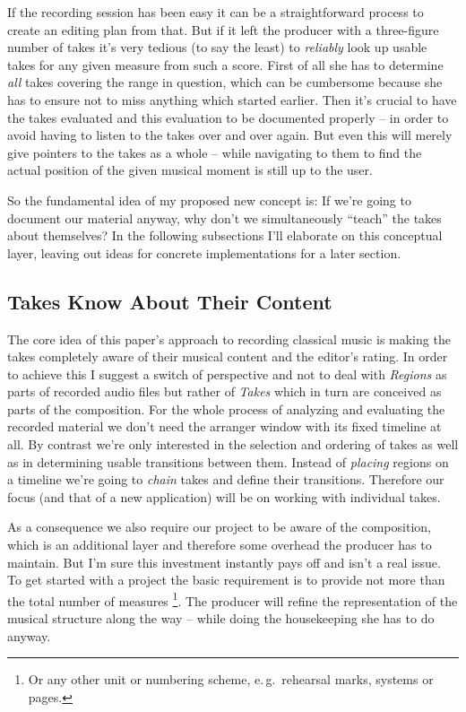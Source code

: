 \documentclass[11pt,a4paper]{article}
\begin{document}
If the recording session has been easy it can be a straightforward process to
create an editing plan from that.
But if it left the producer with a three-figure number of takes it's very
tedious (to say the least) to \emph{reliably} look up usable takes for any given
measure from such a score.
First of all she has to determine \emph{all} takes covering the range in
question, which can be cumbersome because she has to ensure not to miss anything
which started earlier.
Then it's crucial to have the takes evaluated and this evaluation to be
documented properly -- in order to avoid having to listen to the takes over and
over again.
But even this will merely give pointers to the takes as a whole -- while
navigating to them to find the actual position of the given musical moment is
still up to the user.

So the fundamental idea of my proposed new concept is:
If we're going to document our material anyway, why don't we simultaneously
“teach” the takes about themselves?
In the following subsections I'll elaborate on this conceptual layer, leaving out
ideas for concrete implementations for a later section.

\subsection{Takes Know About Their Content}

The core idea of this paper's approach to recording classical music is making
the takes completely aware of their musical content and the editor's rating.
In order to achieve this I suggest a switch of perspective and not to deal with
\emph{Regions} as parts of recorded audio files but rather of \emph{Takes} which
in turn are conceived as parts of the composition.
For the whole process of analyzing and evaluating the recorded material we don't
need the arranger window with its fixed timeline at all.
By contrast we're only interested in the selection and ordering of takes as well
as in determining usable transitions between them.
Instead of \emph{placing} regions on a timeline we're going to \emph{chain}
takes and define their transitions.
Therefore our focus (and that of a new application) will be on working with
individual takes.

As a consequence we also require our project to be aware of the composition,
which is an additional layer and therefore some overhead the producer has to
maintain.
But I'm sure this investment instantly pays off and isn't a real issue.
To get started with a project the basic requirement is to provide not more than
the total number of measures%
\footnote{Or any other unit or numbering scheme, e.\,g.\ rehearsal marks,
systems or pages.}.
The producer will refine the representation of the musical structure along the
way -- while doing the housekeeping she has to do anyway.
\end{document}
